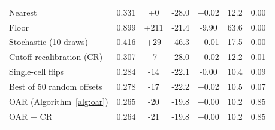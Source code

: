 \begin{table}[t]
{\begin{tabular}{lcccccc}
\quad Nearest & 0.331 & +0 & -28.0 & +0.02 & 12.2 & 0.00 \\
\quad Floor & 0.899 & +211 & -21.4 & -9.90 & 63.6 & 0.00 \\
\quad Stochastic (10 draws) & 0.416 & +29 & -46.3 & +0.01 & 17.5 & 0.00 \\
\quad Cutoff recalibration (CR) & 0.307 & -7 & -28.0 & +0.02 & 12.2 & 0.01 \\
\quad Single-cell flips & 0.284 & -14 & -22.1 & -0.00 & 10.4 & 0.09 \\
\quad Best of 50 random offsets & 0.278 & -17 & -22.2 & +0.02 & 10.5 & 0.07 \\
\quad OAR (Algorithm~\ref{alg:oar}) & 0.265 & -20 & -19.8 & +0.00 & 10.2 & 0.85 \\
\quad OAR + CR & 0.264 & -21 & -19.8 & +0.00 & 10.2 & 0.85 \\
\bottomrule
\end{tabular}}
\end{table}

